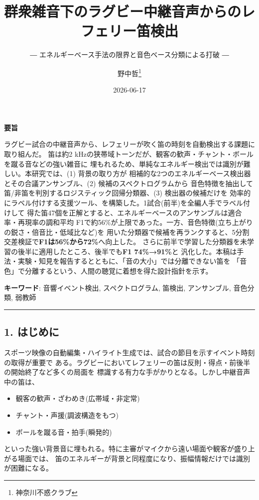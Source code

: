 \documentclass[
  japanese,
]{ltjsarticle}
\title{群衆雑音下のラグビー中継音声からのレフェリー笛検出}
\subtitle{― エネルギーベース手法の限界と音色ベース分類による打破 ―}
\author{野中哲\thanks{神奈川不惑クラブ}}
\date{2026-06-17}
\providecommand{\tightlist}{%
  \setlength{\itemsep}{0pt}\setlength{\parskip}{0pt}}
\begin{document}
\maketitle

\textbf{要旨}

ラグビー試合の中継音声から、レフェリーが吹く笛の時刻を自動検出する課題に取り組んだ。
笛は約2
kHzの狭帯域トーンだが、観客の歓声・チャント・ボールを蹴る音などの強い雑音に
埋もれるため、単純なエネルギー検出では識別が難しい。本研究では、(1)
背景の取り方が
相補的な2つのエネルギーベース検出器とその合議アンサンブル、(2)
候補のスペクトログラムから
音色特徴を抽出して笛/非笛を判別するロジスティック回帰分類器、(3)
検出器の候補だけを
効率的にラベル付けする支援ツール、を構築した。1試合(前半)を全編人手でラベル付けして
得た笛47個を正解とすると、エネルギーベースのアンサンブルは適合率・再現率の調和平均
F1で約56\%が上限であった。一方、音色特徴(立ち上がりの鋭さ・倍音比・低域比など)を
用いた分類器で候補を再ランクすると、5分割交差検証で\textbf{F1は56\%から72\%}へ向上した。
さらに前半で学習した分類器を未学習の後半に適用したところ、後半でも\textbf{F1
74\%→91\%}と
汎化した。本稿は手法・実験・知見を報告するとともに、「音の大小」では分離できない笛を
「音色」で分離するという、人間の聴覚に着想を得た設計指針を示す。

\textbf{キーワード}: 音響イベント検出, スペクトログラム, 笛検出,
アンサンブル, 音色分類, 弱教師

\begin{center}\rule{0.5\linewidth}{0.5pt}\end{center}

\subsection{1. はじめに}\label{ux306fux3058ux3081ux306b}

スポーツ映像の自動編集・ハイライト生成では、試合の節目を示すイベント時刻の取得が重要で
ある。ラグビーにおいてレフェリーの笛は反則・得点・前後半の開始終了など多くの局面を
標識する有力な手がかりとなる。しかし中継音声中の笛は、

\begin{itemize}
\tightlist
\item
  観客の歓声・ざわめき(広帯域・非定常)
\item
  チャント・声援(調波構造をもつ)
\item
  ボールを蹴る音・拍手(瞬発的)
\end{itemize}

といった強い背景音に埋もれる。特に主審がマイクから遠い場面や観客が盛り上がる場面では、
笛のエネルギーが背景と同程度になり、振幅情報だけでは識別が困難になる。
\end{document}
